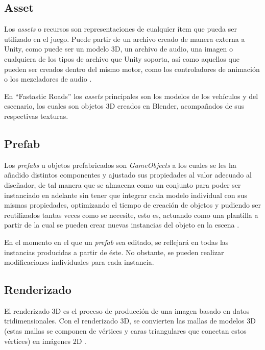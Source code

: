 \subsection{Asset}

Los \textit{assets} o recursos son representaciones de cualquier ítem que pueda ser utilizado en el juego. Puede partir de un archivo creado de manera externa a Unity, como puede ser un modelo 3D, un archivo de audio, una imagen o cualquiera de los tipos de archivo que Unity soporta, así como aquellos que pueden ser creados dentro del mismo motor, como los controladores de animación o los mezcladores de audio \cite{doc:assets}.

En ``Fastastic Roads'' los \textit{assets} principales son los modelos de los vehículos y del escenario, los cuales son objetos 3D creados en Blender, acompañados de sus respectivas texturas.

\subsection{Prefab}

Los \textit{prefabs} u objetos prefabricados son \textit{GameObjects} a los cuales se les ha añadido distintos componentes y ajustado sus propiedades al valor adecuado al diseñador, de tal manera que se almacena como un conjunto para poder ser instanciado en adelante sin tener que integrar cada modelo individual con sus mismas propiedades, optimizando el tiempo de creación de objetos y pudiendo ser reutilizados tantas veces como se necesite, esto es, actuando como una plantilla a partir de la cual se pueden crear nuevas instancias del objeto en la escena \cite{doc:prefab}.

En el momento en el que un \textit{prefab} sea editado, se reflejará en todas las instancias producidas a partir de éste. No obstante, se pueden realizar modificaciones individuales para cada instancia.

\subsection{Renderizado}

El renderizado 3D es el proceso de producción de una imagen basado en datos tridimensionales. Con el renderizado 3D, se convierten las mallas de modelos 3D (estas mallas se componen de vértices y caras triangulares que conectan estos vértices) en imágenes 2D \cite{doc:renderer}. 

